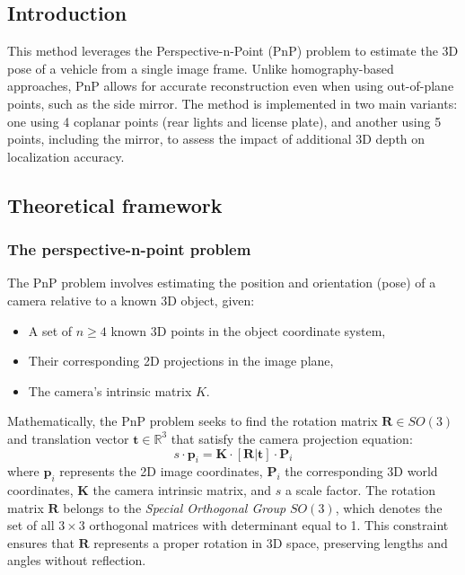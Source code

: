 \subsection{Introduction}
This method leverages the Perspective-n-Point (PnP) problem to estimate the 3D pose of a vehicle from a single image frame. Unlike homography-based approaches, PnP allows for accurate reconstruction even when using out-of-plane points, such as the side mirror. The method is implemented in two main variants: one using 4 coplanar points (rear lights and license plate), and another using 5 points, including the mirror, to assess the impact of additional 3D depth on localization accuracy.

\subsection{Theoretical framework}
\subsubsection{The perspective-n-point problem}
The PnP problem involves estimating the position and orientation (pose) of a camera relative to a known 3D object, given:
\begin{itemize}
    \item A set of $n \geq 4$ known 3D points in the object coordinate system,
    \item Their corresponding 2D projections in the image plane,
    \item The camera's intrinsic matrix $K$.

\end{itemize}

Mathematically, the PnP problem seeks to find the rotation matrix $\mathbf{R} \in SO(3)$ and translation vector $\mathbf{t} \in \mathbb{R}^3$ that satisfy the camera projection equation:
\begin{equation}
    s \cdot \mathbf{p}_i = \mathbf{K} \cdot [\mathbf{R}|\mathbf{t}] \cdot \mathbf{P}_i
\end{equation}
where $\mathbf{p}_i$ represents the 2D image coordinates, $\mathbf{P}_i$ the corresponding 3D world coordinates, $\mathbf{K}$ the camera intrinsic matrix, and $s$ a scale factor. The rotation matrix $\mathbf{R}$ belongs to the \textit{Special Orthogonal Group} $SO(3)$, which denotes the set of all $3 \times 3$ orthogonal matrices with determinant equal to 1. This constraint ensures that $\mathbf{R}$ represents a proper rotation in 3D space, preserving lengths and angles without reflection. 

